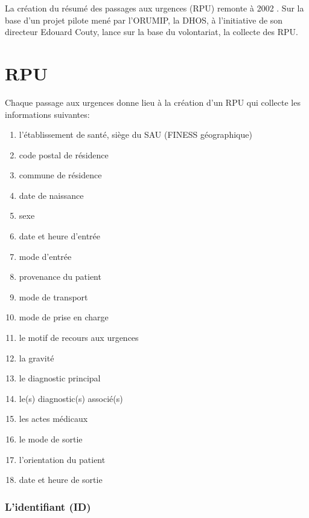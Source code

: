 \documentclass[12pt,english,french,twoside]{book}\usepackage[]{graphicx}\usepackage[]{color}
\begin{document}
La création du résumé des passages aux urgences (RPU) remonte à 2002 \cite{11}. Sur la base d'un projet pilote mené par l'ORUMIP, la DHOS, à l'initiative de son directeur Edouard Couty, lance sur la base du volontariat, la collecte des RPU.

\section*{RPU}

Chaque passage aux urgences donne lieu à la création d'un RPU qui collecte les informations suivantes:
\begin{enumerate}
  \item l'établissement de santé, siège du SAU (FINESS géographique)
  \item code postal de résidence
  \item commune de résidence
  \item date de naissance
  \item sexe
  \item date et heure d'entrée
  \item mode d'entrée
  \item provenance du patient
  \item mode de transport
  \item mode de prise en charge
  \item le motif de recours aux urgences
  \item la gravité
  \item le diagnostic principal
  \item le(s) diagnostic(s) associé(s)
  \item les actes médicaux
  \item le mode de sortie
  \item l'orientation du patient
  \item date et heure de sortie
\end{enumerate}

\subsubsection{L'identifiant (ID)}
\end{document}
